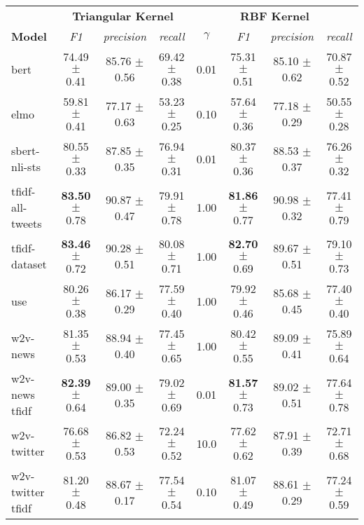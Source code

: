 \begin{tabular}{|l|ccc|cccc|}
\hline
\rowcolor{gray!25}
                           &\multicolumn{3}{c}{\textbf{Triangular Kernel}}&\multicolumn{4}{|c|}{\textbf{RBF Kernel}}\\
\cline{2-8}\textbf{Model}&\textit{F1} &  \textit{precision} &  \textit{recall} & $\gamma$ &       \textit{F1} &\textit{precision} &\textit{recall} \\
\hline
             bert  &  74.49 $\pm$ 0.41 &  85.76 $\pm$ 0.56 &  69.42 $\pm$ 0.38 &     0.01 &  75.31 $\pm$ 0.51 &  85.10 $\pm$ 0.62 &  70.87 $\pm$ 0.52 \\
             elmo  &  59.81 $\pm$ 0.41 &  77.17 $\pm$ 0.63 &  53.23 $\pm$ 0.25 &     0.10 &  57.64 $\pm$ 0.36 &  77.18 $\pm$ 0.29 &  50.55 $\pm$ 0.28 \\
    sbert-nli-sts  &  80.55 $\pm$ 0.33 &  87.85 $\pm$ 0.35 &  76.94 $\pm$ 0.31 &     0.01 &  80.37 $\pm$ 0.36 &  88.53 $\pm$ 0.37 &  76.26 $\pm$ 0.32 \\
 tfidf-all-tweets  &\textbf{83.50} $\pm$ 0.78 &  90.87 $\pm$ 0.47 &  79.91 $\pm$ 0.78 &     1.00 &\textbf{81.86} $\pm$ 0.77 &  90.98 $\pm$ 0.32 &  77.41 $\pm$ 0.79 \\
    tfidf-dataset  &\textbf{83.46} $\pm$ 0.72 &  90.28 $\pm$ 0.51 &  80.08 $\pm$ 0.71 &     1.00 &\textbf{82.70} $\pm$ 0.69 &  89.67 $\pm$ 0.51 &  79.10 $\pm$ 0.73 \\
              use  &  80.26 $\pm$ 0.38 &  86.17 $\pm$ 0.29 &  77.59 $\pm$ 0.40 &     1.00 &  79.92 $\pm$ 0.46 & 85.68 $\pm$ 0.45 &  77.40 $\pm$ 0.40 \\
         w2v-news  &  81.35 $\pm$ 0.53 &  88.94 $\pm$ 0.40 &  77.45 $\pm$ 0.65 &     1.00 &  80.42 $\pm$ 0.55 & 89.09 $\pm$ 0.41 &  75.89 $\pm$ 0.64 \\
    w2v-news tfidf &\textbf{82.39} $\pm$ 0.64 &  89.00 $\pm$ 0.35 &  79.02 $\pm$ 0.69 &     0.01 &\textbf{81.57} $\pm$ 0.73 &  89.02 $\pm$ 0.51 &  77.64 $\pm$ 0.78 \\
      w2v-twitter  &  76.68 $\pm$ 0.53 &  86.82 $\pm$ 0.53 &  72.24 $\pm$ 0.52 &     10.0 &  77.62 $\pm$ 0.62 &  87.91 $\pm$ 0.39 &  72.71 $\pm$ 0.68 \\
 w2v-twitter tfidf &  81.20 $\pm$ 0.48 &  88.67 $\pm$ 0.17 &  77.54 $\pm$ 0.54 &     0.10 &  81.07 $\pm$ 0.49 &  88.61 $\pm$ 0.29 &  77.24 $\pm$ 0.59 \\
\hline
\end{tabular}
